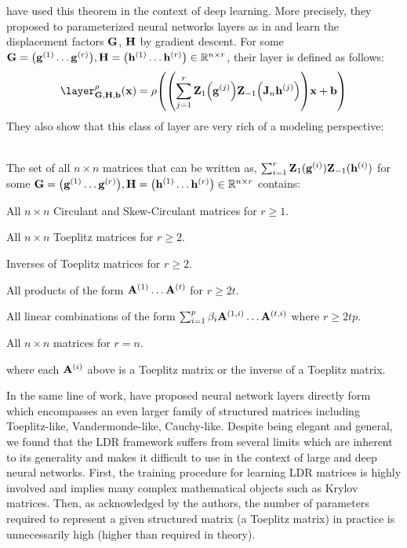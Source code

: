 \noindent
\citet{sindhwani2015structured} have used this theorem in the context of deep learning.
More precisely, they proposed to parameterized neural networks layers as in  and learn the displacement factors $\mathbf{G}$, $\mathbf{H}$ by gradient descent. 
For some $\Gmat = \leftmat \gvec^{(1)} \ldots \gvec^{(r)} \rightmat, \Hmat = \leftmat \hvec^{(1)} \ldots \hvec^{(r)} \rightmat \in \Rbb^{n \times r}$, their layer is defined as follows:
\begin{equation}
  \layer^\act_{\Gmat, \Hmat, \bvec}(\xvec) = \act \left( \left(\sum_{j=1}^{r} \Zmat_1\left(\gvec^{(j)}\right) \Zmat_{-1}\left(\Jmat_n \hvec^{(j)}\right) \right) \xvec + \bvec \right)
\end{equation}
\noindent
They also show that this class of layer are very rich of a modeling perspective:
\begin{theorem} ~\\
  The set of all $n \times n$ matrices that can be written as, $\sum_{i=1}^{r} \mathbf{Z}_1(\mathbf{g}^{(i)}) \mathbf{Z}_{-1}(\mathbf{h}^{(i)})$
  for some $\Gmat = \leftmat \gvec^{(1)} \ldots \gvec^{(r)} \rightmat,
  \Hmat = \leftmat \hvec^{(1)} \ldots \hvec^{(r)} \rightmat \in \Rbb^{n \times r}$ contains:
  \begin{compactitem}
    \item All $n \times n$ Circulant and Skew-Circulant matrices for $r \geq 1$.
    \item All $n \times n$ Toeplitz matrices for $r \geq 2$.
    \item Inverses of Toeplitz matrices for $r \geq 2$.
    \item All products of the form $\mathbf{A}^{(1)} \ldots \mathbf{A}^{(t)}$ for $r \geq 2t$.
    \item All linear combinations of the form $\sum_{i=1}^p \beta_i \mathbf{A}^{(1, i)} \ldots \mathbf{A}^{(t, i)}$ where $r \geq 2tp$.
    \item All $n\times n$ matrices for $r=n$.
  \end{compactitem}
  where each $\mathbf{A}^{(i)}$ above is a Toeplitz matrix or the inverse of a Toeplitz matrix. 
\end{theorem}
\noindent
In the same line of work, \citet{thomas2018learning} have proposed neural network layers directly form  which encompasses an even larger family of structured matrices including Toeplitz-like, Vandermonde-like, Cauchy-like.
Despite being elegant and general, we found that the LDR framework suffers from several limits which are inherent to its generality and makes it difficult to use in the context of large and deep neural networks.
First, the training procedure for learning LDR matrices is highly involved and implies many complex mathematical objects such as Krylov matrices.
Then, as acknowledged by the authors, the number of parameters required to represent a given structured matrix (a Toeplitz matrix) in practice is unnecessarily high (higher than required in theory). 

